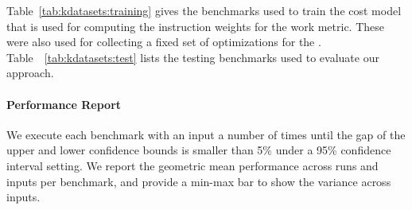 
Table~\ref{tab:kdatasets:training} gives the benchmarks used to train the cost model that is used for computing the instruction weights for
the work metric. These were also used for collecting a fixed set of optimizations for the {\itercomp}. Table~~\ref{tab:kdatasets:test}
lists the testing benchmarks used to evaluate our approach.


\paragraph{Performance Report}
We execute each benchmark with an input a number of times until the gap of the upper and lower confidence bounds is smaller than 5\% under
a 95\% confidence interval setting. We report the geometric mean performance across runs and inputs per benchmark, and provide a min-max
bar to show the variance across inputs.


